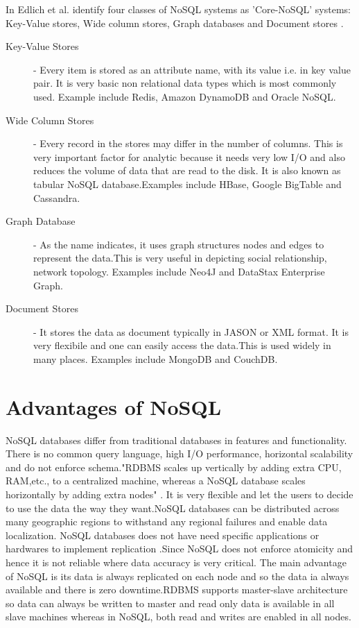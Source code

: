 \documentclass[sigconf]{acmart}
\begin{document}
In Edlich et al. identify four classes of NoSQL systems as 'Core-NoSQL' systems: Key-Value stores, Wide column stores, Graph databases and Document stores \cite{edmodel}.
\begin{description}

\item[Key-Value Stores] - Every item is stored as an attribute name, with its value i.e. in key value pair. It is very basic non relational data types which is most commonly used. Example include Redis, Amazon DynamoDB and Oracle NoSQL. 

\item[Wide Column Stores] - Every record in the stores may differ in the number of columns. This is very important factor for analytic because it needs very low I/O and also reduces the volume of data that are read to the disk. It is also known as tabular NoSQL database.Examples include HBase, Google BigTable and Cassandra.

\item[Graph Database] - As the name indicates, it uses graph structures nodes and edges to represent the data.This is very useful in depicting social relationship, network topology. Examples include Neo4J and DataStax Enterprise Graph. 

\item[Document Stores] - It stores the data as document typically in JASON or XML format. It is very flexibile and one can easily access the data.This is used widely in many places. Examples include MongoDB and CouchDB.
\end{description}

\section{Advantages of NoSQL}

NoSQL databases differ from traditional databases in features and functionality. There is no common query language, high I/O performance, horizontal scalability and do not enforce schema."RDBMS scales up vertically by adding extra CPU, RAM,etc., to a centralized machine, whereas a NoSQL database scales horizontally by adding extra nodes" \cite{DataStax}. It is very flexible and let the users to decide to use the data the way they want.NoSQL databases can be distributed across many geographic regions to withstand any regional failures and enable data localization. NoSQL databases does not have need specific applications or hardwares to implement replication \cite{mongo}.Since NoSQL does not enforce atomicity and hence it is not reliable where data accuracy is very critical. The main advantage of NoSQL is its data is always replicated on each node and so the data ia always available and there is zero downtime.RDBMS supports master-slave architecture so data can always be written to master and read only data is available in all slave machines whereas in NoSQL, both read and writes are enabled in all nodes.
\end{document}
